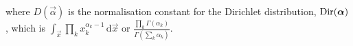     where $D(\vec \alpha)$ is the normalisation constant for the Dirichlet distribution, $\operatorname{Dir}(\boldsymbol{\mathbf{\alpha}})$, which is $\int_{\vec x} \prod_k x_k^{\alpha_k - 1} \,\mathrm d\vec x$ or $\frac{\prod_k \Gamma(\alpha_k)}{\Gamma\left(\sum_k \alpha_k\right)}$.





